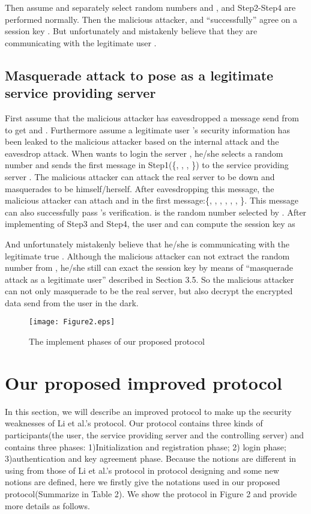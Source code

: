 \documentclass[preprint,12pt]{elsarticle}
\begin{document}
Then assume  and  separately select random numbers  and , and Step2-Step4 are performed normally. Then the malicious attacker,  and  ``successfully'' agree on a session key . But unfortunately  and  mistakenly believe that they are communicating with the legitimate user .

\subsection{Masquerade attack to pose as a legitimate service providing server}
First assume that the malicious attacker has eavesdropped a message send from  to get  and . Furthermore assume a legitimate user 's security information has been leaked to the malicious attacker based on the internal attack and the eavesdrop attack. When  wants to login the server , he/she selects a random number  and sends the first message in Step1(\{, , , \}) to the service providing server . The malicious attacker can attack the real server  to be down and masquerades to be  himself/herself. After eavesdropping this message, the malicious attacker can attach  and  in the first message:\{, , , , , ,  \}. This message can also successfully pass 's verification.  is the random number selected by . After implementing of Step3 and Step4, the user  and  can compute the session key as

And unfortunately  mistakenly believe that he/she is communicating with the legitimate true . Although the malicious attacker can not extract the random number  from , he/she still can exact the session key  by means of ``masquerade attack as a legitimate user'' described in Section 3.5. So the malicious attacker can not only masquerade to be the real server, but also decrypt the encrypted data send from the user in the dark.

\begin{figure}[!htb]
\begin{center}
\texttt{[image: Figure2.eps]}
\caption{The implement phases of our proposed protocol}
\end{center}
\end{figure}

\section{Our proposed improved protocol}
In this section, we will describe an improved protocol to make up the security weaknesses of Li et al.'s protocol. Our protocol contains three kinds of participants(the user, the service providing server and the controlling server) and contains three phases: 1)Initialization and registration phase; 2) login phase; 3)authentication and key agreement phase. Because the notions are different in using from those of Li et al.'s protocol in protocol designing and some new notions are defined, here we firstly give the notations used in our proposed protocol(Summarize in Table 2). We show the protocol in Figure 2 and provide more details as follows.
\end{document}
